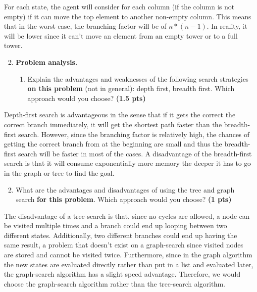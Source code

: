 \documentclass[11pt,a4paper]{report}
\begin{document}
\begin{answer}
For each state, the agent will consider for each column (if the column is not empty) if it can move the top element to another non-empty column.
This means that in the worst case, the branching factor will be of \(n*(n-1)\).
In reality, it will be lower since it can't move an element from an empty tower or to a full tower.
\end{answer}



\begin{enumerate}
\setcounter{enumi}{1}
    \item \textbf{Problem analysis.}
    \begin{enumerate}
        \item Explain the advantages and weaknesses of the following search strategies \textbf{on this problem} (not in general): depth first, breadth first. Which approach would you choose? \textbf{(1.5 pts)}
    \end{enumerate}
\end{enumerate}

\begin{answer}
Depth-first search is advantageous in the sense that if it gets the correct the correct branch immediately, it will get the shortest path faster than the breadth-first search.
However, since the branching factor is relatively high, the chances of getting the correct branch from at the beginning are small and thus the breadth-first search will be faster in most of the cases.
A disadvantage of the breadth-first search is that it will consume exponentially more memory the deeper it has to go in the graph or tree to find the goal.
\end{answer}



\begin{enumerate}
\setcounter{enumi}{1}
\begin{enumerate}
\setcounter{enumii}{1}
    \item What are the advantages and disadvantages of using the tree and graph search \textbf{for this problem}. Which approach would you choose? \textbf{(1 pts)}
\end{enumerate}
\end{enumerate}

\begin{answers}[4cm]
The disadvantage of a tree-search is that, since no cycles are allowed, a node can be visited multiple times and a branch could end up looping between two different states.
Additionally, two different branches could end up having the same result, a problem that doesn't exist on a graph-search since visited nodes are stored and cannot be visited twice.
Furthermore, since in the graph algorithm the new states are evaluated directly rather than put in a list and evaluated later, the graph-search algorithm has a slight speed advantage.
Therefore, we would choose the graph-search algorithm rather than the tree-search algorithm.
\end{answers}
\end{document}
